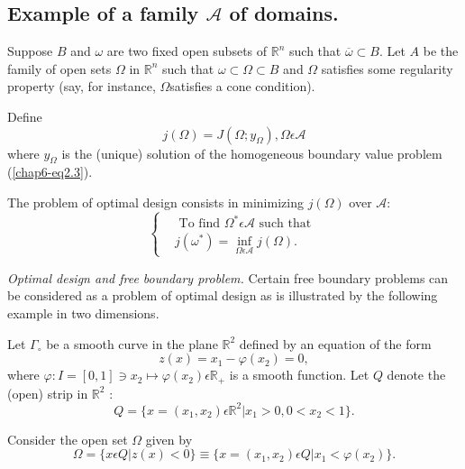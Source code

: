 \setcounter{subsection}{4}
\subsection{Example of a family $\mathscr{A}$ of domains.} Suppose $B$
and $\omega$ are two fixed open subsets of $\mathbb{R}^{n}$ such that
$\overline{\omega} \subset B$. Let $A$ be the family of open sets
$\Omega$ in $\mathbb{R}^{n}$ such that $\omega \subset \Omega \subset
B$ and $\Omega$ satisfies some regularity property (say, for instance,
$\Omega$\pageoriginale satisfies a cone condition). 

Define
\begin{equation*}
j(\Omega) = J(\Omega; y_{\Omega}), \Omega \epsilon \mathscr{A}\tag{2.5}\label{chap6-eq2.5}
\end{equation*}
where $y_{\Omega}$ is the (unique) solution of the homogeneous boundary value problem (\ref{chap6-eq2.3}).

The problem of optimal design consists in minimizing $j(\Omega)$ over $\mathscr{A}$:
\begin{equation*}
\begin{cases}
& \text{ To find } \Omega^{*} \epsilon \mathscr{A} \text{ such that }\\
& j(\omega^{*}) = \inf_{\Omega \epsilon \mathscr{A}} j(\Omega).\tag{2.6}\label{chap6-eq2.6}
\end{cases}
\end{equation*}


{\em Optimal design and free boundary problem.} Certain free boundary
problems can be considered as a problem of optimal design as is
illustrated by the following example in two dimensions. 

Let $\Gamma_{\circ}$ be a smooth curve in the plane $\mathbb{R}^{2}$
defined by an equation of the form 
\begin{equation*}
z(x) = x_{1} - \varphi (x_{2}) = 0,\tag{2.7}\label{chap6-eq2.7}
\end{equation*}
where $\varphi : I = [0, 1] \ni x_{2} \mapsto \varphi (x_{2}) \epsilon
\mathbb{R}_{+}$ is a  smooth function. Let $Q$ denote the (open) strip
in $\mathbb{R}^{2}$ : 
\begin{equation*}
Q = \{x = (x_{1}, x_{2}) \epsilon \mathbb{R}^{2} | x_{1} > 0, 0 < x_{2} < 1 \}.\tag{2.8}\label{chap6-eq2.8}
\end{equation*}

Consider the open set $\Omega$ given by
\begin{equation*}
\Omega = \{x \epsilon Q | z(x) < 0 \} \equiv \{x = (x_{1}, x_{2}) \epsilon Q | x_{1} < \varphi (x_{2}) \}.\tag{2.9}\label{chap6-eq2.9}
\end{equation*}

